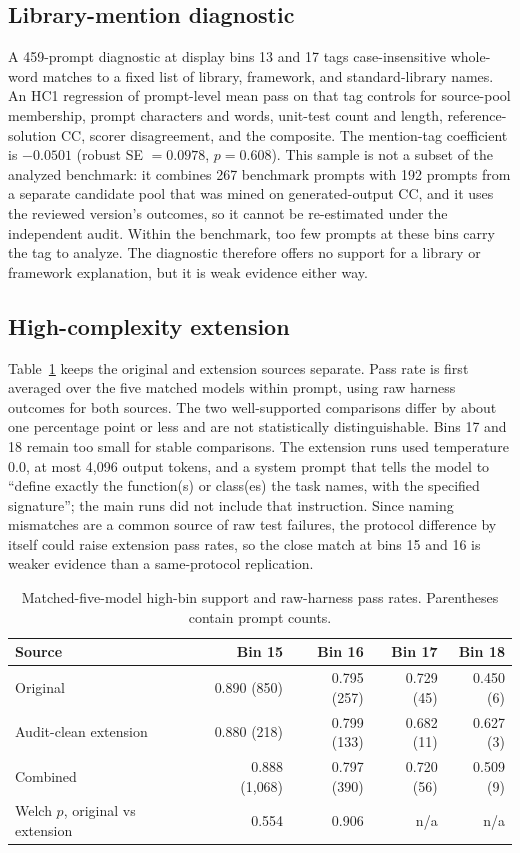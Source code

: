 \documentclass{article}
\begin{document}
\subsection{Library-mention diagnostic}
\label{app:library}

A 459-prompt diagnostic at display bins 13 and 17 tags case-insensitive whole-word matches to a fixed list of library, framework, and standard-library names. An HC1 regression of prompt-level mean pass on that tag controls for source-pool membership, prompt characters and words, unit-test count and length, reference-solution CC, scorer disagreement, and the composite. The mention-tag coefficient is $-0.0501$ (robust SE $=0.0978$, $p=0.608$). This sample is not a subset of the analyzed benchmark: it combines 267 benchmark prompts with 192 prompts from a separate candidate pool that was mined on generated-output CC, and it uses the reviewed version's outcomes, so it cannot be re-estimated under the independent audit. Within the benchmark, too few prompts at these bins carry the tag to analyze. The diagnostic therefore offers no support for a library or framework explanation, but it is weak evidence either way.

\subsection{High-complexity extension}
\label{app:tail}

Table~\ref{tab:tail-detail} keeps the original and extension sources separate. Pass rate is first averaged over the five matched models within prompt, using raw harness outcomes for both sources. The two well-supported comparisons differ by about one percentage point or less and are not statistically distinguishable. Bins 17 and 18 remain too small for stable comparisons. The extension runs used temperature 0.0, at most 4{,}096 output tokens, and a system prompt that tells the model to ``define exactly the function(s) or class(es) the task names, with the specified signature''; the main runs did not include that instruction. Since naming mismatches are a common source of raw test failures, the protocol difference by itself could raise extension pass rates, so the close match at bins 15 and 16 is weaker evidence than a same-protocol replication.

\begin{table}[h]
\centering
\caption{Matched-five-model high-bin support and raw-harness pass rates. Parentheses contain prompt counts.}
\label{tab:tail-detail}
\begin{tabular}{@{}lrrrr@{}}
\toprule
Source & Bin 15 & Bin 16 & Bin 17 & Bin 18 \\
\midrule
Original & 0.890 (850) & 0.795 (257) & 0.729 (45) & 0.450 (6) \\
Audit-clean extension & 0.880 (218) & 0.799 (133) & 0.682 (11) & 0.627 (3) \\
Combined & 0.888 (1{,}068) & 0.797 (390) & 0.720 (56) & 0.509 (9) \\
\midrule
Welch $p$, original vs extension & 0.554 & 0.906 & n/a & n/a \\
\bottomrule
\end{tabular}
\end{table}
\end{document}
